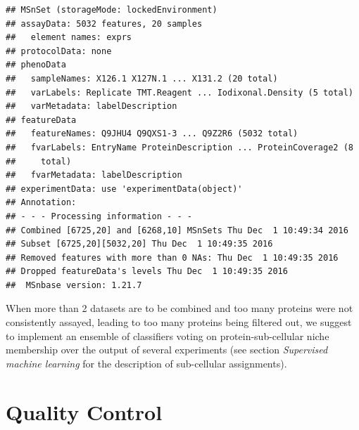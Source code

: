 \begin{knitrout}
\color{fgcolor}\begin{kframe}
\begin{alltt}
 \hlkwb{<-} 
\end{alltt}
\begin{verbatim}
## MSnSet (storageMode: lockedEnvironment)
## assayData: 5032 features, 20 samples 
##   element names: exprs 
## protocolData: none
## phenoData
##   sampleNames: X126.1 X127N.1 ... X131.2 (20 total)
##   varLabels: Replicate TMT.Reagent ... Iodixonal.Density (5 total)
##   varMetadata: labelDescription
## featureData
##   featureNames: Q9JHU4 Q9QXS1-3 ... Q9Z2R6 (5032 total)
##   fvarLabels: EntryName ProteinDescription ... ProteinCoverage2 (8
##     total)
##   fvarMetadata: labelDescription
## experimentData: use 'experimentData(object)'
## Annotation:  
## - - - Processing information - - -
## Combined [6725,20] and [6268,10] MSnSets Thu Dec  1 10:49:34 2016 
## Subset [6725,20][5032,20] Thu Dec  1 10:49:35 2016 
## Removed features with more than 0 NAs: Thu Dec  1 10:49:35 2016 
## Dropped featureData's levels Thu Dec  1 10:49:35 2016 
##  MSnbase version: 1.21.7
\end{verbatim}
\end{kframe}
\end{knitrout}

When more than 2 datasets are to be combined and too many proteins were
not consistently assayed, leading to too many proteins being filtered
out, we suggest to implement an ensemble of classifiers voting on
protein-sub-cellular niche membership over the output of several
experiments (see section \textit{Supervised machine learning} for the
description of sub-cellular assignments).

\section*{Quality Control}

